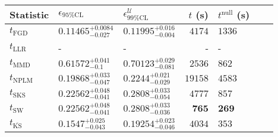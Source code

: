 \begin{tabular}{l|llr|llr}
	Statistic & $\epsilon_{95\%\mathrm{CL}}$ & $\epsilon^    {\mathcal{U}}_{99\%\mathrm{CL}}$ & $t$ (s) & $t^{\mathrm{null}}$ (s) \\
	\midrule
	$t_{\mathrm{FGD}}$ & ${\mathbf{0.11465_{-0.027}^{+0.0084}}}$ & ${\mathbf{0.11995_{-0.004}^{+0.016}}}$ & $4174$ & $1336$ \\
	$t_{\mathrm{LLR}}$ & - & - & - & - \\
	$t_{\mathrm{MMD}}$ & $0.61572_{-0.1}^{+0.041}$ & $0.70123_{-0.081}^{+0.029}$ & $2536$ & $862$ \\
\rowcolor{red!35}	$t_{\mathrm{NPLM}}$ & $0.19868_{-0.047}^{+0.033}$ & $0.2244_{-0.029}^{+0.021}$ & $19158$ & $4583$ \\
	$t_{\mathrm{SKS}}$ & $0.22562_{-0.041}^{+0.048}$ & $0.2808_{-0.054}^{+0.033}$ & $4777$ & $857$ \\
	$t_{\mathrm{SW}}$ & $0.22562_{-0.041}^{+0.048}$ & $0.2808_{-0.036}^{+0.033}$ & ${\mathbf{765}}$ & ${\mathbf{269}}$ \\
	$t_{\overline{\mathrm{KS}}}$ & $0.1547_{-0.043}^{+0.025}$ & $0.19254_{-0.046}^{+0.023}$ & $4034$ & $353$ \\
	\bottomrule
\end{tabular}